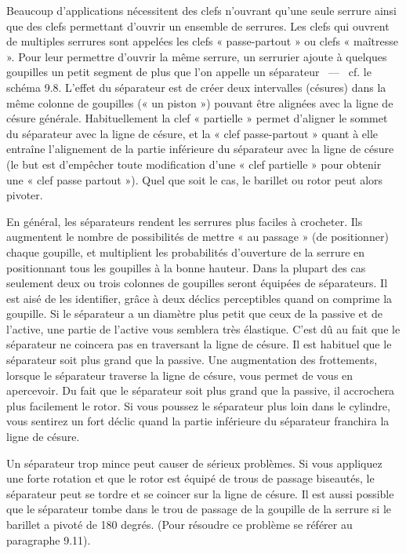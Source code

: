 \documentclass[a4paper,french,11pt,twoside]{report}
\begin{document}
Beaucoup d'applications nécessitent des clefs n'ouvrant qu'une seule serrure ainsi que des clefs permettant d'ouvrir un ensemble de serrures. Les clefs qui ouvrent de multiples serrures sont appelées les clefs « passe-partout » ou clefs « maîtresse ». Pour leur permettre d'ouvrir la même serrure, un serrurier ajoute à quelques goupilles un petit segment de plus que l'on appelle un séparateur ~---~ cf. le schéma 9.8. L'effet du séparateur est de créer deux intervalles (césures) dans la même colonne de goupilles (« un piston ») pouvant être alignées avec la ligne de césure générale. Habituellement la clef « partielle » permet d'aligner le sommet du séparateur avec la ligne de césure, et la « clef passe-partout » quant à elle entraîne l'alignement de la partie inférieure du séparateur avec la ligne de césure (le but est d'empêcher toute modification d'une « clef partielle » pour obtenir une « clef passe partout »). Quel que soit le cas, le barillet ou rotor peut alors pivoter.

En général, les séparateurs rendent les serrures plus faciles à crocheter. Ils augmentent le nombre de possibilités de mettre « au passage » (de positionner) chaque goupille, et multiplient les probabilités d'ouverture de la serrure en positionnant tous les goupilles à la bonne hauteur. Dans la plupart des cas seulement deux ou trois colonnes de goupilles seront équipées de séparateurs. Il est aisé de les identifier, grâce à deux déclics perceptibles quand on comprime la goupille. Si le séparateur a un diamètre plus petit que ceux de la passive et de l'active, une partie de l'active vous semblera très élastique. C'est dû au fait que le séparateur ne coincera pas en traversant la ligne de césure. Il est habituel que le séparateur soit plus grand que la passive. Une augmentation des frottements, lorsque le séparateur traverse la ligne de césure, vous permet de vous en apercevoir. Du fait que le séparateur soit plus grand que la passive, il accrochera plus facilement le rotor. Si vous poussez le séparateur plus loin dans le cylindre, vous sentirez un fort déclic quand la partie inférieure du séparateur franchira la ligne de césure.

Un séparateur trop mince peut causer de sérieux problèmes. Si vous appliquez une forte rotation et que le rotor est équipé de trous de passage biseautés, le séparateur peut se tordre et se coincer sur la ligne de césure. Il est aussi possible que le séparateur tombe dans le trou de passage de la goupille de la serrure si le barillet a pivoté de 180 degrés. (Pour résoudre ce problème se référer au paragraphe 9.11).
\end{document}
